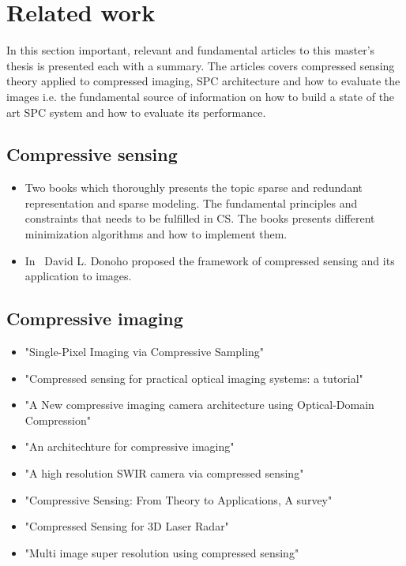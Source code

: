 \section{Related work}
In this section important, relevant and fundamental articles to this master's thesis is presented each with a summary. The articles covers compressed sensing theory applied to compressed imaging, SPC architecture and how to evaluate the images i.e. the fundamental source of information on how to build a state of the art SPC system and how to evaluate its performance. 

\subsection{Compressive sensing}
\begin{itemize}


\item \cite{book:sm, book:srr} Two books which thoroughly presents the topic sparse and redundant representation and sparse modeling. The fundamental principles and constraints that needs to be fulfilled in CS. The books presents different minimization algorithms and how to implement them.   

\item In~\cite{article:CS_donoho1} David L. Donoho proposed the framework of compressed sensing and its application to images.

\end{itemize}
\subsection{Compressive imaging}
\begin{itemize}
\item \cite{article:single_pixel_im_cs} "Single-Pixel Imaging via Compressive Sampling"
\item \cite{article:cs_for_prac_ios_a_tut} "Compressed sensing for practical optical imaging systems: a tutorial"

\item \cite{article:a_new_ci_arc} "A New compressive imaging camera architecture using Optical-Domain Compression"

\item \cite{article:an_Arcitecture_for_CI} "An architechture for compressive imaging"

\item \cite{article:a_high_res_swir} "A high resolution SWIR camera via compressed sensing"

\item \cite{article:cs_for_prac_ios_a_tut} "Compressive Sensing: From Theory to Applications, A survey"

\item \cite{mt:EF} "Compressed Sensing for 3D Laser Radar"  

\item \cite{article:misuperres} "Multi image super resolution using compressed sensing" 
	
\end{itemize}
    
